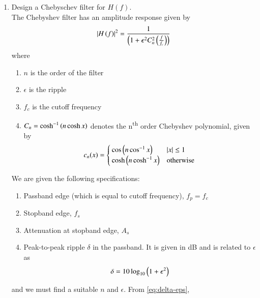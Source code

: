 \documentclass[journal,12pt,twocolumn]{IEEEtran}
\renewcommand\thesection{\arabic{section}}
\begin{document}
\begin{enumerate}[label=\thesection.\arabic*
,ref=\thesection.\theenumi]
	Hence, we take $n = 5$. Solving for $f_c$ in $\eqref{eq:fc1}$ and
	\eqref{eq:fc2},
	\begin{align}
		f_{c1} = f_p\sbrak{10^{-\frac{A_p}{10}} - 1}^{-\frac{1}{2n}} = 57.23 \,Hz \\
		f_{c2} = f_s\sbrak{10^{-\frac{A_s}{10}} - 1}^{-\frac{1}{2n}} = 63.26 \,Hz
	\end{align}
	Hence, we take $f_c = \sqrt{f_{c1}f_{c2}} = 60 \, Hz$ approximately.
\item Design a Chebyschev filter for $H(f)$.\\
	\solution The Chebyshev filter has an amplitude response
	given by
	\begin{align}
		\left\vert H\left(f\right)\right\vert^2 = \frac{1}{\left(1 + \epsilon^2C_n^2\left(\frac{f}{f_c}\right)\right)}
	\end{align}
	where 
	\begin{enumerate}
		\item $n$ is the order of the filter
		\item $\epsilon$ is the ripple
		\item $f_c$ is the cutoff frequency 
		\item $C_n = \cosh^{-1}\left(n\cosh{x}\right)$ denotes 
		the n\textsuperscript{th} order Chebyshev polynomial,
		given by
		\begin{align}
			c_n(x) =
			\begin{cases}
				\cos\left(n\cos^{-1}x\right) & \left\vert x\right\vert \le 1 \\
				\cosh\left(n\cosh^{-1}x\right) & \textrm{otherwise}
			\end{cases}
			\label{eq:chebypol}
		\end{align}
	\end{enumerate}
	We are given the following specifications:
	\begin{enumerate}
		\item Passband edge (which is equal to 
		cutoff frequency), $f_p = f_c$
		\item Stopband edge, $f_s$
		\item Attenuation at stopband edge, $A_s$
		\item Peak-to-peak ripple $\delta$ in the passband.
		It is given in dB and is related to $\epsilon$ as
		\begin{align}
			\delta = 10\log_{10}\left(1 + \epsilon^2\right)
			\label{eq:delta-eps}
		\end{align}
	\end{enumerate}
	and we must find a suitable $n$ and $\epsilon$. From
	\eqref{eq:delta-eps},
	\begin{align}

\end{align}
\end{enumerate}
\end{document}
